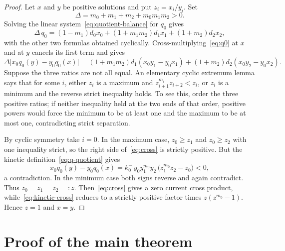 \documentclass[11pt,reqno]{amsart}
\theoremstyle{plain}
\theoremstyle{definition}
\theoremstyle{remark}
\numberwithin{equation}{section}
\begin{document}
\begin{proof}
Let $x$ and $y$ be positive solutions and put $z_i=x_i/y_i$.  Set
\begin{equation}\label{eq:Delta}
\Delta=m_0+m_1+m_2+m_0m_1m_2>0 .
\end{equation}
Solving the linear system~\eqref{eq:quotient-balance} for $q_0$ gives
\begin{equation}\label{eq:q0}
\Delta\,q_0=(1-m_1)d_0x_0+(1+m_1m_2)d_1x_1+(1+m_2)d_2x_2,
\end{equation}
with the other two formulas obtained cyclically.  Cross-multiplying~\eqref{eq:q0} at $x$ and at $y$ cancels its first term and gives
\begin{equation}\label{eq:cross}
\Delta\bigl[x_0q_0(y)-y_0q_0(x)\bigr]
=(1+m_1m_2)d_1(x_0y_1-y_0x_1)+(1+m_2)d_2(x_0y_2-y_0x_2).
\end{equation}
Suppose the three ratios are not all equal.  An elementary cyclic extremum lemma says that for some $i$, either $z_i$ is a maximum and $z_{i+1}^{m_i}z_{i+2}<z_i$, or $z_i$ is a minimum and the reverse strict inequality holds.  To see this, order the three positive ratios; if neither inequality held at the two ends of that order, positive powers would force the minimum to be at least one and the maximum to be at most one, contradicting strict separation.

By cyclic symmetry take $i=0$.  In the maximum case, $z_0\ge z_1$ and $z_0\ge z_2$ with one inequality strict, so the right side of~\eqref{eq:cross} is strictly positive.  But the kinetic definition~\eqref{eq:q-quotient} gives
\begin{equation}\label{eq:kinetic-cross}
x_0q_0(y)-y_0q_0(x)=k_0^-\,y_0y_1^{m_0}y_2\,\bigl(z_1^{m_0}z_2-z_0\bigr)<0,
\end{equation}
a contradiction.  In the minimum case both signs reverse and again contradict.  Thus $z_0=z_1=z_2=:z$.  Then~\eqref{eq:cross} gives a zero current cross product, while~\eqref{eq:kinetic-cross} reduces to a strictly positive factor times $z(z^{m_0}-1)$.  Hence $z=1$ and $x=y$.
\end{proof}

\section{Proof of the main theorem}\label{sec:proof}
\end{document}
